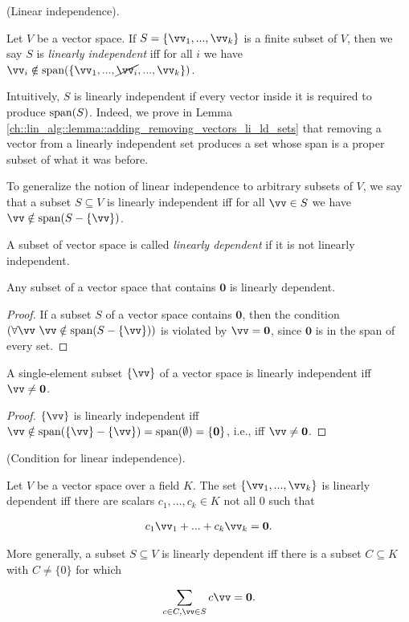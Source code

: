 \begin{defn}
    (Linear independence).
    
    Let $V$ be a vector space. If $S = \{\vv_1, ..., \vv_k\}$ is a finite subset of $V$, then we say $S$ is \textit{linearly independent} iff for all $i$ we have $\vv_i \notin \spann(\{\vv_1, ..., \cancel{\vv_i}, ..., \vv_k\})$.
    
    Intuitively, $S$ is linearly independent if every vector inside it is required to produce $\text{span}(S)$. Indeed, we prove in Lemma \ref{ch::lin_alg::lemma::adding_removing_vectors_li_ld_sets} that removing a vector from a linearly independent set produces a set whose span is a proper subset of what it was before.
    
    To generalize the notion of linear independence to arbitrary subsets of $V$, we say that a subset $S \subseteq V$ is linearly independent iff for all $\vv \in S$ we have $\vv \notin \spann(S - \{\vv\})$.
    
    A subset of vector space is called \textit{linearly dependent} if it is not linearly independent.
\end{defn}

\begin{theorem}
    Any subset of a vector space that contains $\mathbf{0}$ is linearly dependent.
\end{theorem}

\begin{proof}
    If a subset $S$ of a vector space contains $\mathbf{0}$, then the condition $(\forall \vv \spc \vv \notin \spann(S - \{\vv\}))$ is violated by $\vv = \mathbf{0}$, since $\mathbf{0}$ is in the span of every set.
\end{proof}

\begin{theorem}
    A single-element subset $\{\vv\}$ of a vector space is linearly independent iff $\vv \neq \mathbf{0}$.
\end{theorem}

\begin{proof}
   $\{\vv\}$ is linearly independent iff $\vv \notin \spann(\{\vv\} - \{\vv\}) = \spann(\emptyset) = \{\mathbf{0}\}$, i.e., iff $\vv \neq \mathbf{0}$.
\end{proof}

\begin{theorem}
    (Condition for linear independence).
    
    Let $V$ be a vector space over a field $K$. The set $\{\vv_1, ..., \vv_k\}$ is linearly dependent iff there are scalars $c_1, ..., c_k \in K$ not all $0$ such that
    
    \begin{align*}
        c_1 \vv_1 + ... + c_k \vv_k = \mathbf{0}.
    \end{align*}
    
    More generally, a subset $S \subseteq V$ is linearly dependent iff there is a subset $C \subseteq K$ with $C \neq \{0\}$ for which
    
    \begin{align*}
        \sum_{c \in C, \vv \in S} c \vv = \mathbf{0}.
    \end{align*}
\end{theorem}

